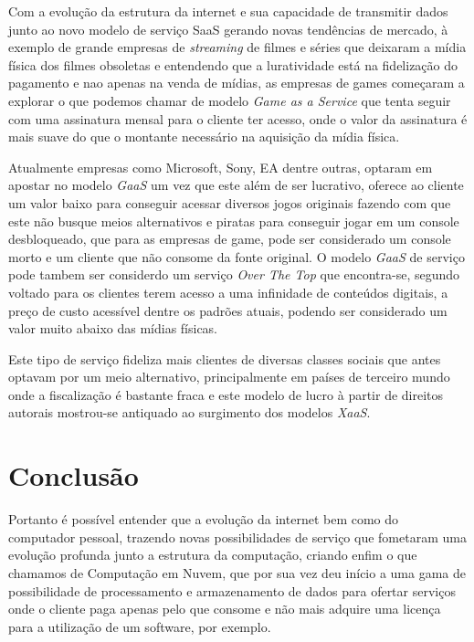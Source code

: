 \begin{justify}
    Com a evolução da estrutura da internet e sua capacidade de transmitir dados junto ao novo
    modelo de serviço SaaS gerando novas tendências de mercado, à exemplo de grande empresas de
    \textit{streaming} de filmes e séries que deixaram a mídia física dos filmes obsoletas e
    entendendo que a luratividade está na fidelização do pagamento e nao apenas na venda de mídias,
    as empresas de games começaram a explorar o que podemos chamar de modelo \textit{Game as a
    Service} que tenta seguir com uma assinatura mensal para o cliente ter acesso, onde o valor da
    assinatura é mais suave do que o montante necessário na aquisição da mídia física.

    Atualmente empresas como Microsoft, Sony, EA dentre outras, optaram em apostar no modelo
    \textit{GaaS} um vez que este além de ser lucrativo, oferece ao cliente um valor baixo para
    conseguir acessar diversos jogos originais fazendo com que este não busque meios alternativos e
    piratas para conseguir jogar em um console desbloqueado, que para as empresas de game, pode ser
    considerado um console morto e um cliente que não consome da fonte original.
    O modelo \textit{GaaS} de serviço pode tambem ser considerdo um serviço \textit{Over The Top} que
    encontra-se, segundo \cite{tristao2020pirataria} voltado para os clientes terem acesso a uma
    infinidade de conteúdos digitais, a preço de custo acessível dentre os padrões atuais, podendo
    ser considerado um valor muito abaixo das mídias físicas.

    Este tipo de serviço fideliza mais clientes de diversas classes sociais que antes optavam por um
    meio alternativo, principalmente em países de terceiro mundo onde a fiscalização é bastante
    fraca e este modelo de lucro à partir de direitos autorais mostrou-se antiquado ao surgimento
    dos modelos \textit{XaaS}.

    \section{Conclusão}
    Portanto é possível entender que a evolução da internet bem como do computador pessoal, trazendo
    novas possibilidades de serviço que fometaram uma evolução profunda junto a estrutura
    da computação, criando enfim o que chamamos de Computação em Nuvem, que por sua vez deu início a
    uma gama de possibilidade de processamento e armazenamento de dados para ofertar serviços onde o
    cliente paga apenas pelo que consome e não mais adquire uma licença para a utilização de um
    software, por exemplo.


\end{justify}
